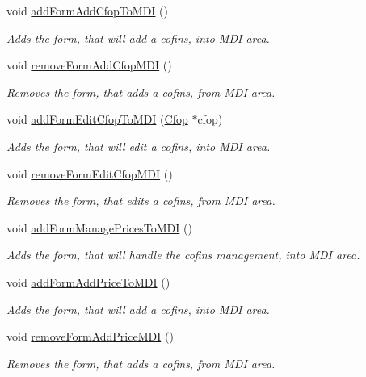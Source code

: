 \begin{DoxyCompactItemize}
void \hyperlink{class_main_window_a042e51f04f18e468644654b140fbf441}{add\-Form\-Add\-Cfop\-To\-M\-D\-I} ()
\begin{DoxyCompactList}\small\item\em \-Adds the form, that will add a cofins, into \-M\-D\-I area. \end{DoxyCompactList}\item 
void \hyperlink{class_main_window_a2dfb906a11260e99937a96ce2699d4bc}{remove\-Form\-Add\-Cfop\-M\-D\-I} ()
\begin{DoxyCompactList}\small\item\em \-Removes the form, that adds a cofins, from \-M\-D\-I area. \end{DoxyCompactList}\item 
void \hyperlink{class_main_window_a74db9d8824dbb9d667e5fad281df71cc}{add\-Form\-Edit\-Cfop\-To\-M\-D\-I} (\hyperlink{class_cfop}{\-Cfop} $\ast$cfop)
\begin{DoxyCompactList}\small\item\em \-Adds the form, that will edit a cofins, into \-M\-D\-I area. \end{DoxyCompactList}\item 
void \hyperlink{class_main_window_af5f39d22f42c5f4a9e85bdc8df96f2da}{remove\-Form\-Edit\-Cfop\-M\-D\-I} ()
\begin{DoxyCompactList}\small\item\em \-Removes the form, that edits a cofins, from \-M\-D\-I area. \end{DoxyCompactList}\item 
void \hyperlink{class_main_window_aa7553e70099ea7680ff858f4ef4b19be}{add\-Form\-Manage\-Prices\-To\-M\-D\-I} ()
\begin{DoxyCompactList}\small\item\em \-Adds the form, that will handle the cofins management, into \-M\-D\-I area. \end{DoxyCompactList}\item 
void \hyperlink{class_main_window_ab23f69a20e7e91fcd042e2bf1990b616}{add\-Form\-Add\-Price\-To\-M\-D\-I} ()
\begin{DoxyCompactList}\small\item\em \-Adds the form, that will add a cofins, into \-M\-D\-I area. \end{DoxyCompactList}\item 
void \hyperlink{class_main_window_a4b1edd84e974286875a2e4da4d2be54c}{remove\-Form\-Add\-Price\-M\-D\-I} ()
\begin{DoxyCompactList}\small\item\em \-Removes the form, that adds a cofins, from \-M\-D\-I area. \end{DoxyCompactList}\item 

\end{DoxyCompactItemize}
